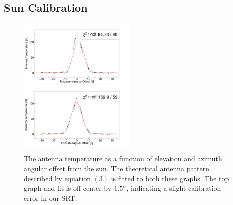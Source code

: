 \subsection{Sun Calibration}
\begin{figure}
  \includegraphics[width=0.5\textwidth]{elevation} \includegraphics[width=0.5\textwidth]{azimuth_large}
  \caption{The antenna temperature as a function of elevation and azimuth angular offset from the sun. The theoretical antenna pattern described by equation $(3)$ is fitted to both these graphs. The top graph and fit is off center by $1.5\degree$, indicating a slight calibration error in our SRT.}
\end{figure}

